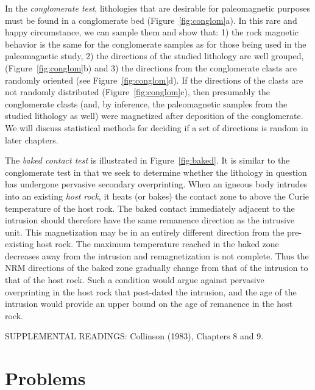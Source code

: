 In the
 {\it conglomerate test}, lithologies that are  desirable for
paleomagnetic purposes must be found in a conglomerate bed
(Figure~\ref{fig:conglom}a).  In this
rare and happy circumstance, we can sample them and show that: 1) the
rock magnetic behavior is the same  for the conglomerate samples as
for those being used in the paleomagnetic study, 2) the directions
of the studied lithology are well grouped, (Figure~\ref{fig:conglom}b) and
3) the directions from the conglomerate clasts 
are randomly oriented (see Figure~\ref{fig:conglom}d).  If the directions of the clasts are not randomly distributed
(Figure~\ref{fig:conglom}c), 
then presumably the conglomerate clasts (and, by inference, 
the paleomagnetic samples from the studied lithology as
well) were magnetized after deposition of the conglomerate. 
We will discuss statistical methods for deciding if a set of directions
is random in later chapters.  


%
The {\it baked contact test} is illustrated in Figure~\ref{fig:baked}.  It
is similar to the conglomerate test in that we seek to determine whether the 
lithology in question has undergone pervasive secondary overprinting.  When
an igneous body intrudes into an existing 
{\it host rock}, it heats (or bakes) the contact zone to above the Curie temperature of the host
rock.  The baked contact immediately adjacent to the intrusion should therefore
have the same remanence direction as the intrusive unit.  This
magnetization
may be in an entirely different direction from the pre-existing host rock. The
maximum temperature reached in the baked zone decreases away from the intrusion
and remagnetization is not complete.  Thus the NRM directions of the baked zone
gradually change from that of the intrusion to that of the host rock.  Such
a condition would argue against pervasive overprinting in the  host rock that post-dated the
intrusion,  and the age of the intrusion would provide an 
upper bound on the age of remanence in the host rock.

\vskip 6pt
\noindent SUPPLEMENTAL READINGS: Collinson (1983), Chapters 8 and 9. \nocite{collinson83}

\vskip -6pt


\section{Problems}

